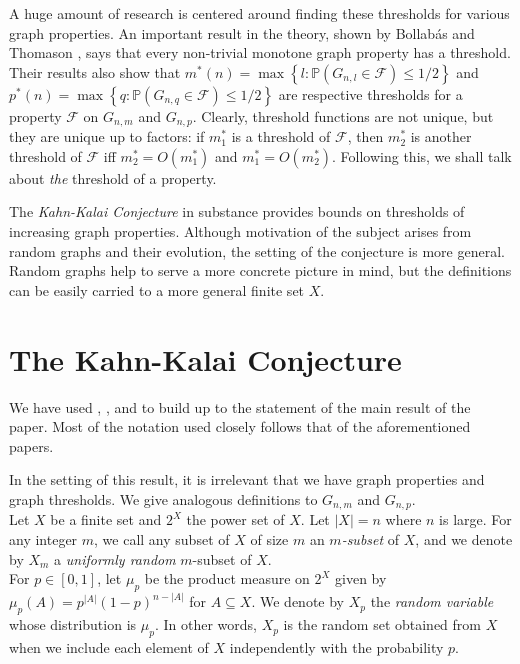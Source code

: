 \documentclass[12pt,oneside,reqno]{amsart}
\theoremstyle{definition}
\numberwithin{equation}{theorem}
\newcommand{\cF}{{\mathcal F}}
\begin{document}
A huge amount of research is centered around finding these thresholds for various graph properties. An important result in the theory, shown by Bollab\'{a}s and Thomason \cite{tf}, says that every non-trivial monotone graph property has a threshold. Their results also show that $m^*(n)=\max \left\{l: \mathbb{P}(G_{n,l}\in \cF) \leq 1 / 2\right\}$ and $p^*(n)=\max \left\{q: \mathbb{P}(G_{n,q}\in \cF) \leq 1 / 2\right\}$ are respective thresholds for a property $\cF$ on $G_{n,m}$ and $G_{n,p}$. Clearly, threshold functions are not unique, but they are unique up to factors: if $m_1^*$ is a threshold of $\cF$, then $m_2^*$ is another threshold of $\cF$ iff $m_2^*=O\left(m_1^*\right)$ and $m_1^*=O\left(m_2^*\right)$. Following this, we shall talk about \emph{the} threshold of a property. 
\newline 

The \emph{Kahn-Kalai Conjecture} in substance provides bounds on thresholds of increasing graph properties. Although motivation of the subject arises from random graphs and their evolution, the setting of the conjecture is more general. Random graphs help to serve a more concrete picture in mind, but the definitions can be easily carried to a more general finite set $X$.

\section{The Kahn-Kalai Conjecture}
We have used \cite{ppkkc}, \cite{okkc}, and \cite{ffkkc} to build up to the statement of the main result of the paper. Most of the notation used closely follows that of the aforementioned papers.
\newline

In the setting of this result, it is irrelevant that we have graph properties and graph thresholds. We give analogous definitions to $G_{n,m}$ and $G_{n,p}$. 
\newline
\\
Let $X$ be a finite set and $2^{X}$ the power set of $X$. Let $|X| = n$ where $n$ is large. For any integer $m$, we call any subset of $X$ of size $m$ an $m$\emph{-subset} of $X$, and we denote by $X_m$ a \emph{uniformly random} $m$-subset of $X$.
\newline
\\
For $p \in [0,1]$, let $\mu_p$ be the product measure on $2^X$ given by ${\mu_p(A)=p^{|A|}(1-p)^{n-|A|}}$ for $A \subseteq X$. We denote by $X_p$ the \emph{random variable} whose distribution is $\mu_p$. In other words, $X_p$ is the random set obtained from $X$ when we include each element of $X$ independently with the probability $p$. 
\end{document}
